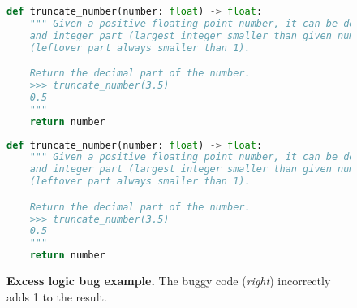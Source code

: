 \begin{figure}[htbp]
\centering
\begin{minipage}{0.45\textwidth}
\begin{lstlisting}[language=Python,breaklines=true,basicstyle=\ttfamily\scriptsize]
def truncate_number(number: float) -> float:
    """ Given a positive floating point number, it can be decomposed into
    and integer part (largest integer smaller than given number) and decimals
    (leftover part always smaller than 1).

    Return the decimal part of the number.
    >>> truncate_number(3.5)
    0.5
    """
    return number \end{lstlisting}
\end{minipage}\hfill
\begin{minipage}{0.45\textwidth}
\begin{lstlisting}[language=Python,breaklines=true,basicstyle=\ttfamily\scriptsize]
def truncate_number(number: float) -> float:
    """ Given a positive floating point number, it can be decomposed into
    and integer part (largest integer smaller than given number) and decimals
    (leftover part always smaller than 1).

    Return the decimal part of the number.
    >>> truncate_number(3.5)
    0.5
    """
    return number \end{lstlisting}
\end{minipage}
\caption{\textbf{Excess logic bug example.} The buggy code (\emph{right}) incorrectly adds 1 to the result.}
\label{fig:excesslogic}
\end{figure}

